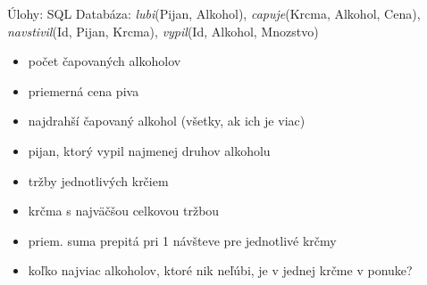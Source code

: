 \documentclass[12pt]{beamer}
\begin{document}
\begin{frame}{Úlohy: SQL}
Databáza: \emph{lubi}(Pijan, Alkohol), \emph{capuje}(Krcma, Alkohol, Cena),
\emph{navstivil}(Id, Pijan, Krcma), \emph{vypil}(Id, Alkohol, Mnozstvo)
\begin{itemize}
	\item počet čapovaných alkoholov
	\item priemerná cena piva
	\item najdrahší čapovaný alkohol (všetky, ak ich je viac)
    \item pijan, ktorý vypil najmenej druhov alkoholu
	\item tržby jednotlivých krčiem
    \item krčma s najväčšou celkovou tržbou
    \item priem. suma prepitá pri 1 návšteve pre jednotlivé krčmy
    \item koľko najviac alkoholov, ktoré nik neľúbi, je v jednej krčme v ponuke?
\end{itemize}
\end{frame}
\end{document}
